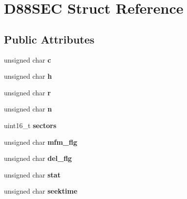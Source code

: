 \hypertarget{structD88SEC}{\section{D88\-S\-E\-C Struct Reference}
\label{structD88SEC}
}
\subsection*{Public Attributes}
\begin{DoxyCompactItemize}
\item 
\hypertarget{structD88SEC_ab8c83a63069d337acb541bab5dcfb1d4}{unsigned char {\bfseries c}}\label{structD88SEC_ab8c83a63069d337acb541bab5dcfb1d4}

\item 
\hypertarget{structD88SEC_a79b510cd60aa6c7f552553773516004e}{unsigned char {\bfseries h}}\label{structD88SEC_a79b510cd60aa6c7f552553773516004e}

\item 
\hypertarget{structD88SEC_a6ac9eb578b61a2ba0f5c5554442f0afb}{unsigned char {\bfseries r}}\label{structD88SEC_a6ac9eb578b61a2ba0f5c5554442f0afb}

\item 
\hypertarget{structD88SEC_a7993ade434d07e9f23c206ba1bcf7f4d}{unsigned char {\bfseries n}}\label{structD88SEC_a7993ade434d07e9f23c206ba1bcf7f4d}

\item 
\hypertarget{structD88SEC_a2b5c683f6c6cddc4c194968dfd128190}{uint16\-\_\-t {\bfseries sectors}}\label{structD88SEC_a2b5c683f6c6cddc4c194968dfd128190}

\item 
\hypertarget{structD88SEC_a50dc1bf38c85aea04c0e7f9d8d992b32}{unsigned char {\bfseries mfm\-\_\-flg}}\label{structD88SEC_a50dc1bf38c85aea04c0e7f9d8d992b32}

\item 
\hypertarget{structD88SEC_ac31ef13fe6ddd271f9b46e2544bd4af6}{unsigned char {\bfseries del\-\_\-flg}}\label{structD88SEC_ac31ef13fe6ddd271f9b46e2544bd4af6}

\item 
\hypertarget{structD88SEC_a45df4775a2d7cae336c334e2b08a4c4d}{unsigned char {\bfseries stat}}\label{structD88SEC_a45df4775a2d7cae336c334e2b08a4c4d}

\item 
\hypertarget{structD88SEC_a40a78584e64013a044008f2027f59e6a}{unsigned char {\bfseries seektime}}\label{structD88SEC_a40a78584e64013a044008f2027f59e6a}


\end{DoxyCompactItemize}
